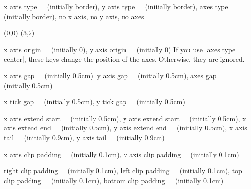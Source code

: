 \begin{sseqdata}[name = basic, cohomological Serre grading]
\begin{keylist}{%
    x axis type =  (initially border),%
    y axis type =  (initially border),%
    axes type =  (initially border),%
    no x axis,%
    no y axis,%
    no axes%
}
\begin{codeexample}[width=6cm]
\begin{sseqpage}[ axes type = frame ]
\class(0,0)
\class(3,2)
\end{sseqpage}
\end{codeexample}
\end{keylist}

\parskip=0pt
\begin{keylist}{%
    x axis origin =  (initially 0),%
    y axis origin =  (initially 0)%
}%
If you use |axes type = center|, these keys change the position of the axes.
Otherwise, they are ignored.
\end{keylist}
%
\begin{keylist}{%
    x axis gap =  (initially 0.5cm),%
    y axis gap =  (initially 0.5cm),%
    axes gap =  (initially 0.5cm)%
}%
%
\end{keylist}
%
\begin{keylist}{%
    x tick gap =  (initially 0.5cm),%
    y tick gap =  (initially 0.5cm)%
}
%
\end{keylist}
%
\begin{keylist}{%
    x axis extend start =  (initially 0.5cm),%
    y axis extend start =  (initially 0.5cm),%
    x axis extend end =  (initially 0.5cm),%
    y axis extend end =  (initially 0.5cm),%
    x axis tail =  (initially 0.9cm),%
    y axis tail =  (initially 0.9cm)%
}
\end{keylist}
%
\begin{keylist}{%
    x axis clip padding =  (initially 0.1cm),%
    y axis clip padding =  (initially 0.1cm)%
}
\end{keylist}
%
\begin{keylist}{%
    right clip padding =  (initially 0.1cm),%
    left clip padding =  (initially 0.1cm),%
    top clip padding =  (initially 0.1cm),%
    bottom clip padding =  (initially 0.1cm)%
}
\end{keylist}

\afterpage{
\begin{center}

\end{center}
}



\end{sseqdata}
